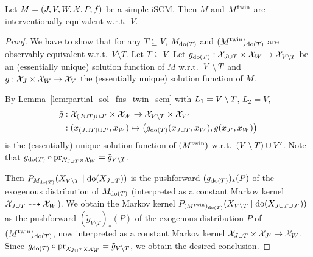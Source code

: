 \begin{Lem}\label{lem:int_equiv_twin_scm}
Let $M = \left ( J, V, W, \mathcal{X}, P, f \right )$ be a simple iSCM. 
Then $M$ and $M^{\mathrm{twin}}$ are interventionally equivalent w.r.t.\ $V$.
\end{Lem}
\begin{proof}
  We have to show that for any $T \subseteq V$, 
  $M_{\operatorname{do}(T)}$ and $(M^{\mathrm{twin}})_{\operatorname{do}(T)}$ are observably equivalent w.r.t.\ $V \setminus T$.
  Let $T \subseteq V$. 
  Let $g_{\operatorname{do}(T)} : \mathcal{X}_{J \cup T} \times \mathcal{X}_W \to \mathcal{X}_{V \setminus T}$ be an (essentially unique) solution function of $M$ w.r.t.\ $V\setminus T$ and $g : \mathcal{X}_J \times \mathcal{X}_W \to \mathcal{X}_V$ the (essentially unique) solution function of $M$.

  By Lemma~\ref{lem:partial_sol_fns_twin_scm} with $L_1 = V \setminus T$, $L_2 = V$, 
  \begin{equation*}\begin{split}
    \tilde{g} & : \mathcal{X}_{(J \cup T) \cup J'} \times \mathcal{X}_W \to \mathcal{X}_{V \setminus T} \times \mathcal{X}_{V'} \\
    & : (x_{(J \cup T) \cup J'}, x_W) \mapsto \big(g_{\operatorname{do}(T)}(x_{J \cup T},x_W),g(x_{J'},x_W)\big) 
  \end{split}\end{equation*}
  is the (essentially) unique solution function of $(M^{\mathrm{twin}})$ w.r.t.\ $(V\setminus T) \cup V'$.
  Note that $g_{\operatorname{do}(T)} \circ \mathrm{pr}_{\mathcal{X}_{J\cup T} \times \mathcal{X}_W} = \tilde{g}_{V\setminus T}$.

  Then $P_{M_{\operatorname{do}(T)}}(X_{V\setminus T} \mid \operatorname{do}(X_{J\cup T}))$ is 
  the pushforward $(g_{\operatorname{do}(T)})_*(P)$ of the exogenous distribution 
  of $M_{\operatorname{do}(T)}$ (interpreted as a constant Markov kernel $\mathcal{X}_{J \cup T} \dashrightarrow \mathcal{X}_W$).
  We obtain the Markov kernel $P_{(M^{\mathrm{twin}})_{\operatorname{do}(T)}}(X_{V \setminus T} \mid \operatorname{do}(X_{J\cup T\cup J'}))$ as the pushforward 
  $(\tilde{g}_{V\setminus T})_*(P)$ of the exogenous distribution $P$ of $(M^{\mathrm{twin}})_{\operatorname{do}(T)}$, now interpreted as a constant
  Markov kernel $\mathcal{X}_{J\cup T} \times \mathcal{X}_{J'} \to \mathcal{X}_W$. 
  Since $g_{\operatorname{do}(T)} \circ \mathrm{pr}_{\mathcal{X}_{J\cup T} \times \mathcal{X}_W} = \tilde{g}_{V\setminus T}$,
  we obtain the desired conclusion.
\end{proof}

